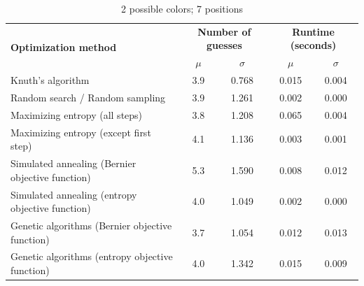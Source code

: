 \documentclass[11pt]{article}
\begin{document}
\begin{table}[h!]
\begin{center}
\begin{tabular}{l c c c c}
\toprule
\multirow{2}{*}{\bfseries Optimization method} 		& \multicolumn{2}{c}{\bfseries Number of guesses} 		& \multicolumn{2}{c}{\bfseries Runtime (seconds)}	\\
\cmidrule(lr){2-3}  \cmidrule(lr){4-5}				& $\mu$ & $\sigma$								& $\mu$ & $\sigma$							\\
\cmidrule(lr){1-5}
Knuth's algorithm							& 3.9 & 0.768									& 0.015 & 0.004							\\
Random search / Random sampling				& 3.9 & 1.261									& 0.002 & 0.000							\\
Maximizing entropy (all steps)					& 3.8 & 1.208									& 0.065 & 0.004							\\
Maximizing entropy (except first step)			& 4.1 & 1.136									& 0.003 & 0.001							\\
Simulated annealing (Bernier objective function)	& 5.3 & 1.590									& 0.008 & 0.012							\\
Simulated annealing (entropy objective function)	& 4.0 & 1.049									& 0.002 & 0.000							\\
Genetic algorithms (Bernier objective function)		& 3.7 & 1.054									& 0.012 & 0.013							\\
Genetic algorithms (entropy objective function)		& 4.0 & 1.342									& 0.015 & 0.009							\\
\bottomrule
\end{tabular}
\end{center}
\caption{2 possible colors; 7 positions}
\label{fig:compare_2_7}
\end{table}

\newpage
\end{document}
